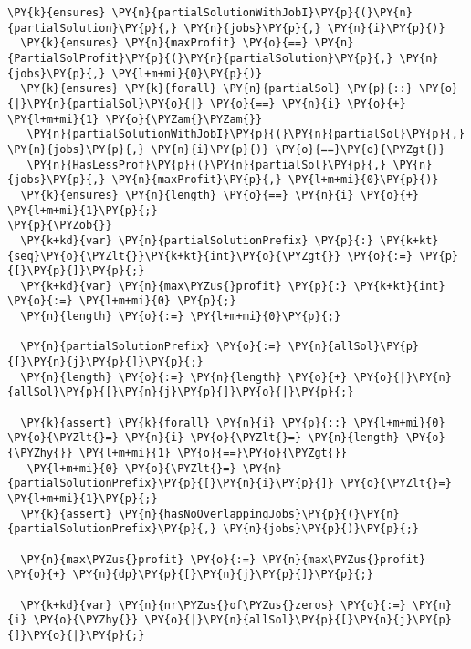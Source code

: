\begin{footnotesize}
\begin{Verbatim}[commandchars=\\\{\}, fontsize=\footnotesize]
  \PY{k}{ensures} \PY{n}{partialSolutionWithJobI}\PY{p}{(}\PY{n}{partialSolution}\PY{p}{,} \PY{n}{jobs}\PY{p}{,} \PY{n}{i}\PY{p}{)}
  \PY{k}{ensures} \PY{n}{maxProfit} \PY{o}{==} \PY{n}{PartialSolProfit}\PY{p}{(}\PY{n}{partialSolution}\PY{p}{,} \PY{n}{jobs}\PY{p}{,} \PY{l+m+mi}{0}\PY{p}{)}
  \PY{k}{ensures} \PY{k}{forall} \PY{n}{partialSol} \PY{p}{::} \PY{o}{|}\PY{n}{partialSol}\PY{o}{|} \PY{o}{==} \PY{n}{i} \PY{o}{+} \PY{l+m+mi}{1} \PY{o}{\PYZam{}\PYZam{}}
   \PY{n}{partialSolutionWithJobI}\PY{p}{(}\PY{n}{partialSol}\PY{p}{,} \PY{n}{jobs}\PY{p}{,} \PY{n}{i}\PY{p}{)} \PY{o}{==}\PY{o}{\PYZgt{}}
   \PY{n}{HasLessProf}\PY{p}{(}\PY{n}{partialSol}\PY{p}{,} \PY{n}{jobs}\PY{p}{,} \PY{n}{maxProfit}\PY{p}{,} \PY{l+m+mi}{0}\PY{p}{)}
  \PY{k}{ensures} \PY{n}{length} \PY{o}{==} \PY{n}{i} \PY{o}{+} \PY{l+m+mi}{1}\PY{p}{;}
\PY{p}{\PYZob{}}
  \PY{k+kd}{var} \PY{n}{partialSolutionPrefix} \PY{p}{:} \PY{k+kt}{seq}\PY{o}{\PYZlt{}}\PY{k+kt}{int}\PY{o}{\PYZgt{}} \PY{o}{:=} \PY{p}{[}\PY{p}{]}\PY{p}{;}
  \PY{k+kd}{var} \PY{n}{max\PYZus{}profit} \PY{p}{:} \PY{k+kt}{int} \PY{o}{:=} \PY{l+m+mi}{0} \PY{p}{;}
  \PY{n}{length} \PY{o}{:=} \PY{l+m+mi}{0}\PY{p}{;}

  \PY{n}{partialSolutionPrefix} \PY{o}{:=} \PY{n}{allSol}\PY{p}{[}\PY{n}{j}\PY{p}{]}\PY{p}{;}
  \PY{n}{length} \PY{o}{:=} \PY{n}{length} \PY{o}{+} \PY{o}{|}\PY{n}{allSol}\PY{p}{[}\PY{n}{j}\PY{p}{]}\PY{o}{|}\PY{p}{;}

  \PY{k}{assert} \PY{k}{forall} \PY{n}{i} \PY{p}{::} \PY{l+m+mi}{0} \PY{o}{\PYZlt{}=} \PY{n}{i} \PY{o}{\PYZlt{}=} \PY{n}{length} \PY{o}{\PYZhy{}} \PY{l+m+mi}{1} \PY{o}{==}\PY{o}{\PYZgt{}}
   \PY{l+m+mi}{0} \PY{o}{\PYZlt{}=} \PY{n}{partialSolutionPrefix}\PY{p}{[}\PY{n}{i}\PY{p}{]} \PY{o}{\PYZlt{}=} \PY{l+m+mi}{1}\PY{p}{;} 
  \PY{k}{assert} \PY{n}{hasNoOverlappingJobs}\PY{p}{(}\PY{n}{partialSolutionPrefix}\PY{p}{,} \PY{n}{jobs}\PY{p}{)}\PY{p}{;}

  \PY{n}{max\PYZus{}profit} \PY{o}{:=} \PY{n}{max\PYZus{}profit} \PY{o}{+} \PY{n}{dp}\PY{p}{[}\PY{n}{j}\PY{p}{]}\PY{p}{;}

  \PY{k+kd}{var} \PY{n}{nr\PYZus{}of\PYZus{}zeros} \PY{o}{:=} \PY{n}{i} \PY{o}{\PYZhy{}} \PY{o}{|}\PY{n}{allSol}\PY{p}{[}\PY{n}{j}\PY{p}{]}\PY{o}{|}\PY{p}{;} 


\end{Verbatim}
\end{footnotesize}
